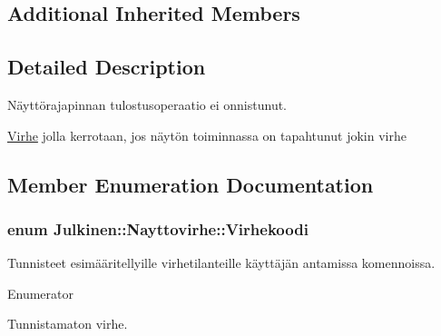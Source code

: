 \subsection*{Additional Inherited Members}


\subsection{Detailed Description}
Näyttörajapinnan tulostusoperaatio ei onnistunut. 

\hyperlink{class_julkinen_1_1_virhe}{Virhe} jolla kerrotaan, jos näytön toiminnassa on tapahtunut jokin virhe 

\subsection{Member Enumeration Documentation}
\hypertarget{class_julkinen_1_1_nayttovirhe_a13d43d49006dab024b0d3ac20a9fb8fa}{}
\subsubsection[{Virhekoodi}]{\setlength{\rightskip}{0pt plus 5cm}enum {\bf Julkinen\+::\+Nayttovirhe\+::\+Virhekoodi}}\label{class_julkinen_1_1_nayttovirhe_a13d43d49006dab024b0d3ac20a9fb8fa}


Tunnisteet esimääritellyille virhetilanteille käyttäjän antamissa komennoissa. 

\begin{Desc}
\item[Enumerator]\par
\begin{description}
\item[{\em 
\hypertarget{class_julkinen_1_1_nayttovirhe_a13d43d49006dab024b0d3ac20a9fb8faa26e7e527083430befdfdcd45f270514b}{}V\+I\+R\+H\+E\+\_\+\+T\+U\+N\+N\+I\+S\+T\+A\+M\+A\+T\+O\+N\label{class_julkinen_1_1_nayttovirhe_a13d43d49006dab024b0d3ac20a9fb8faa26e7e527083430befdfdcd45f270514b}
}]Tunnistamaton virhe. \end{description}
\end{Desc}


